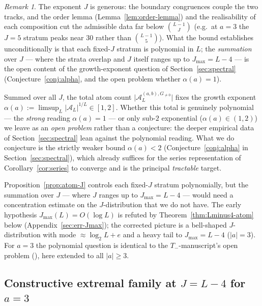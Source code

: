 \documentclass[11pt,reqno]{amsart}
\theoremstyle{plain}
\theoremstyle{definition}
\theoremstyle{remark}
\newtheorem{remark}[theorem]{Remark}
\newcommand{\Tneg}{T_{-}}
\newcommand{\Atom}{\mathcal{A}}
\begin{document}
\begin{remark}
The exponent $J$ is generous: the boundary congruences couple the two
tracks, and the order lemma (Lemma~\ref{lem:order-lemma}) and the
realisability of each composition cut the admissible data far below
$\binom{L-1}{J}$ (e.g.\ at $a = 3$ the $J = 5$ stratum peaks near
$30$ rather than $\binom{L-1}{5}$). What the bound establishes
unconditionally is that each fixed-$J$ stratum is polynomial in $L$; the
\emph{summation} over $J$ --- where the strata overlap and $J$ itself
ranges up to $J_{\max} = L - 4$ --- is the open content of the
growth-exponent question of Section~\ref{sec:spectral}
(Conjecture~\ref{conj:alpha}, and the open problem whether $\alpha(a) = 1$).
\end{remark}

Summed over all $J$, the total atom count $\lvert \Atom_L^{(a,b),
G_{\ne 0}} \rvert$ fixes the growth exponent
$\alpha(a) := \limsup_L \lvert \Atom_L \rvert^{1/L} \in [1, 2]$. Whether
this total is genuinely polynomial --- the \emph{strong} reading
$\alpha(a) = 1$ --- or only sub-$2$ exponential ($\alpha(a) \in (1, 2)$)
we leave as an \emph{open problem} rather than a conjecture: the deeper
empirical data of Section~\ref{sec:spectral} lean against the polynomial
reading. What we do conjecture is the strictly weaker bound
$\alpha(a) < 2$ (Conjecture~\ref{conj:alpha} in
Section~\ref{sec:spectral}), which already suffices for the series
representation of Corollary~\ref{cor:series} to converge and is the
principal \emph{tractable} target.

Proposition~\ref{prop:atom-J} controls each fixed-$J$ stratum
polynomially, but the summation over $J$ --- where $J$ ranges up to
$J_{\max} = L - 4$ --- would need a concentration estimate on the
$J$-distribution that we do not have. The early hypothesis
$J_{\max}(L) = O(\log L)$ is refuted by Theorem~\ref{thm:Lminus4-atom}
below (Appendix~\ref{sec:err-Jmax}); the corrected picture is a bell-shaped
$J$-distribution with mode
$\approx \log_2 L + e$ and a heavy tail to $J_{\max} = L - 4$
($\lvert a \rvert = 3$). For $a = 3$ the polynomial question is identical
to the $\Tneg$-manuscript's open problem
(\cite[Section~6.4]{ObstructionResidues2026}), here extended to all
$\lvert a \rvert \ge 3$.

\subsection{Constructive extremal family at \texorpdfstring{$J = L - 4$}{J=L-4} for \texorpdfstring{$a = 3$}{a=3}}
\end{document}
